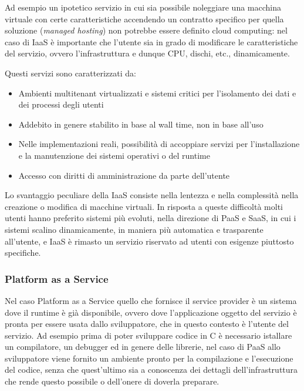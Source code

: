 \documentclass[italian,]{article}
\providecommand{\tightlist}{%
  \setlength{\itemsep}{0pt}\setlength{\parskip}{0pt}}
\begin{document}
Ad esempio un ipotetico servizio in cui sia possibile noleggiare una
macchina virtuale con certe caratteristiche accendendo un contratto
specifico per quella soluzione (\emph{managed hosting}) non potrebbe
essere definito cloud computing: nel caso di IaaS è importante che
l'utente sia in grado di modificare le caratteristiche del servizio,
ovvero l'infrastruttura e dunque CPU, dischi, etc., dinamicamente.

Questi servizi sono caratterizzati da:

\begin{itemize}
\tightlist
\item
  Ambienti multitenant virtualizzati e sistemi critici per l'isolamento
  dei dati e dei processi degli utenti
\item
  Addebito in genere stabilito in base al wall time, non in base all'uso
\item
  Nelle implementazioni reali, possibilità di accoppiare servizi per
  l'installazione e la manutenzione dei sistemi operativi o del runtime
\item
  Accesso con diritti di amministrazione da parte dell'utente
\end{itemize}

Lo svantaggio peculiare della IaaS consiste nella lentezza e nella
complessità nella creazione o modifica di macchine virtuali. In risposta
a queste difficoltà molti utenti hanno preferito sistemi più evoluti,
nella direzione di PaaS e SaaS, in cui i sistemi scalino dinamicamente,
in maniera più automatica e trasparente all'utente, e IaaS è rimasto un
servizio riservato ad utenti con esigenze piuttosto specifiche.

\subsubsection{Platform as a Service}\label{platform-as-a-service}

Nel caso Platform as a Service quello che fornisce il service provider è
un sistema dove il runtime è già disponibile, ovvero dove l'applicazione
oggetto del servizio è pronta per essere usata dallo sviluppatore, che
in questo contesto è l'utente del servizio. Ad esempio prima di poter
sviluppare codice in C è necessario istallare un compilatore, un
debugger ed in genere delle librerie, nel caso di PaaS allo sviluppatore
viene fornito un ambiente pronto per la compilazione e l'esecuzione del
codice, senza che quest'ultimo sia a conoscenza dei dettagli
dell'infrastruttura che rende questo possibile o dell'onere di doverla
preparare.
\end{document}

